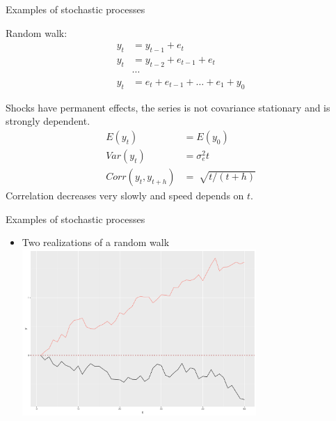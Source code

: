 \documentclass[usenames,dvipsnames]{beamer}
\begin{document}

\begin{frame}{Examples of stochastic processes}

Random walk:  
\begin{align}\nonumber
y_t &= y_{t-1}+e_t \\\nonumber 
y_t &= y_{t-2}+e_{t-1}+e_t \\\nonumber
& \cdots \\\nonumber
y_t &= e_t+e_{t-1} + \dots +e_1+y_0 
\end{align} 

Shocks have permanent effects, the series is not covariance stationary and is strongly dependent.
\begin{align}\nonumber
E(y_t) & =E(y_0) \\\nonumber
Var(y_t) & =\sigma^2_e t \\\nonumber
Corr(y_t,y_{t+h}) & =\sqrt[]{t/(t+h)}
\end{align} 
Correlation decreases very slowly and speed depends on $t$.

\end{frame}


\begin{frame}{Examples of stochastic processes}
\begin{itemize}
\item Two realizations of a random walk \\
\vspace{0.5cm}
\includegraphics[width=0.7\textwidth]{img/random_walk.pdf}
\end{itemize}
\end{frame}

\end{document}
